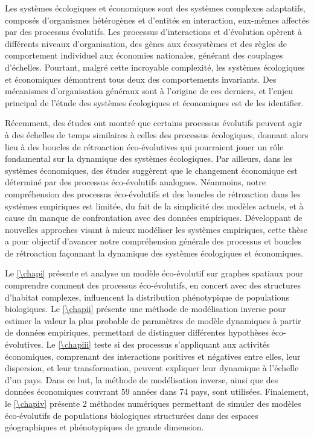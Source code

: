 \label{sec:summary-fr}
\small{
Les systèmes écologiques et économiques sont des systèmes complexes adaptatifs, composés d'organismes hétérogènes et d'entités en interaction, eux-mêmes affectés par des processus évolutifs. Les processus d'interactions et d'évolution opèrent à différents niveaux d'organisation, des gènes aux écosystèmes et des règles de comportement individuel aux économies nationales, générant des couplages d'échelles. Pourtant, malgré cette incroyable complexité, les systèmes écologiques et économiques démontrent tous deux des comportements invariants. Des mécanismes d'organisation généraux sont à l'origine de ces derniers, et l'enjeu principal de l'étude des systèmes écologiques et économiques est de les identifier.
 
Récemment, des études ont montré que certains processus évolutifs peuvent agir à des échelles de temps similaires à celles des processus écologiques, donnant alors lieu à des boucles de rétroaction éco-évolutives qui pourraient jouer un rôle fondamental sur la dynamique des systèmes écologiques. Par ailleurs, dans les systèmes économiques, des études suggèrent que le changement économique est déterminé par des processus éco-évolutifs analogues. Néanmoins, notre compréhension des processus éco-évolutifs et des boucles de rétroaction dans les systèmes empiriques est limitée, du fait de la simplicité des modèles actuels, et à cause du manque de confrontation avec des données empiriques.  Développant de nouvelles approches visant à mieux modéliser les systèmes empiriques, cette thèse a pour objectif d'avancer notre compréhension générale des processus et boucles de rétroaction façonnant la dynamique des systèmes écologiques et économiques.
 
Le \cref{\chapi} présente et analyse un modèle éco-évolutif sur graphes spatiaux pour comprendre comment des processus éco-évolutifs, en concert avec des structures d'habitat complexes, influencent la distribution phénotypique de populations biologiques. Le \cref{\chapii} présente une méthode de modélisation inverse pour estimer la valeur la plus probable de paramètres de modèle dynamiques à partir de données empiriques, permettant de distinguer différentes hypothèses éco-évolutives. Le \cref{\chapiii} teste si des processus s'appliquant aux activités économiques, comprenant des interactions positives et négatives entre elles, leur dispersion, et leur transformation, peuvent expliquer leur dynamique à l'échelle d'un pays. Dans ce but, la méthode de modélisation inverse, ainsi que des données économiques couvrant 59 années dans 74 pays, sont utilisées. Finalement, le \cref{\chapiv} présente 2 méthodes numériques permettant de simuler des modèles éco-évolutifs de populations biologiques structurées dans des espaces géographiques et phénotypiques de grande dimension.
 
}
